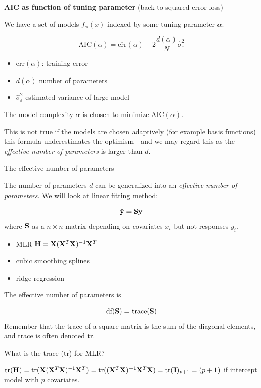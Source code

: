 \documentclass[
  ignorenonframetext,
]{beamer}
\providecommand{\tightlist}{%
  \setlength{\itemsep}{0pt}\setlength{\parskip}{0pt}}
\begin{document}
\begin{frame}

\textbf{AIC as function of tuning parameter} (back to squared error
loss)

We have a set of models \(f_{\alpha}(x)\) indexed by some tuning
parameter \(\alpha\).

\[\text{AIC}(\alpha)=\overline{\text{err}}(\alpha)+2 \frac{d(\alpha)}{N}\hat{\sigma}_{\varepsilon}^2\]

\begin{itemize}
\tightlist
\item
  \(\overline{\text{err}}(\alpha)\): training error
\item
  \(d(\alpha)\) number of parameters
\item
  \(\hat{\sigma}_{\varepsilon}^2\) estimated variance of large model
\end{itemize}

The model complexity \(\alpha\) is chosen to minimize
\(\text{AIC}(\alpha)\).

This is not true if the models are chosen adaptively (for example basis
functions) this formula underestimates the optimism - and we may regard
this as the \emph{effective number of parameters} is larger than \(d\).

\end{frame}

\begin{frame}

\begin{block}{The effective number of parameters}

The number of parameters \(d\) can be generalized into an
\emph{effective number of parameters}. We will look at linear fitting
method:

\[ \hat{\bf y}={\bf Sy}\] where \({\bf S}\) as a \(n \times n\) matrix
depending on covariates \(x_i\) but not responses \(y_i\).

\begin{itemize}
\tightlist
\item
  MLR \({\bf H}={\bf X}({\bf X}^T{\bf X})^{-1}{\bf X}^T\)
\item
  cubic smoothing splines
\item
  ridge regression
\end{itemize}

The effective number of parameters is

\[\text{df}({\bf S})=\text{trace}({\bf S})\] Remember that the trace of
a square matrix is the sum of the diagonal elements, and trace is often
denoted tr.

What is the trace (tr) for MLR?

\(\text{tr}({\bf H})=\text{tr}({\bf X}({\bf X}^T{\bf X})^{-1}{\bf X}^T)=\text{tr}(({\bf X}^T{\bf X})^{-1}{\bf X}^T{\bf X})=\text{tr}({\bf I})_{p+1}=(p+1)\)
if intercept model with \(p\) covariates.

\end{block}

\end{frame}
\end{document}
